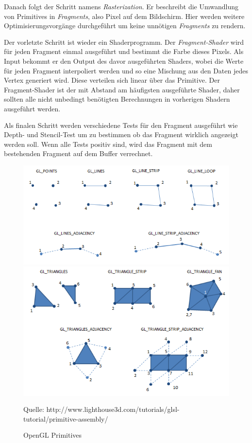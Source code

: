 Danach folgt der Schritt namens \textit{Rasterization}. Er beschreibt die Umwandlung von Primitives in \textit{Fragments}, also Pixel auf dem Bildschirm. Hier werden weitere Optimisierungsvorgänge durchgeführt um keine unnötigen \textit{Fragments} zu rendern.

Der vorletzte Schritt ist wieder ein Shaderprogramm. Der \textit{Fragment-Shader} wird für jeden Fragment einmal ausgeführt und bestimmt die Farbe dieses Pixels. Als Input bekommt er den Output des davor ausgeführten Shaders, wobei die Werte für jeden Fragment interpoliert werden und so eine Mischung aus den Daten jedes Vertex generiert wird. Diese verteilen sich linear über das Primitive. Der Fragment-Shader ist der mit Abstand am häufigsten ausgeführte Shader, daher sollten alle nicht unbedingt benötigten Berechnungen in vorherigen Shadern ausgeführt werden.

Als finalen Schritt werden verschiedene Tests für den Fragment ausgeführt wie Depth- und Stencil-Test um zu bestimmen ob das Fragment wirklich angezeigt werden soll. Wenn alle Tests positiv sind, wird das Fragment mit dem bestehenden Fragment auf dem Buffer verrechnet.

\begin{figure}
	\centering
	\includegraphics[scale=0.7]{02theorie/openglPrimitives.png}
	\includegraphics[scale=0.7]{02theorie/openglPrimitives2.png}
	
	
	Quelle: http://www.lighthouse3d.com/tutorials/glsl-tutorial/primitive-assembly/
	\caption{OpenGL Primitives}\label{OpenGLPrimitives}
\end{figure}


